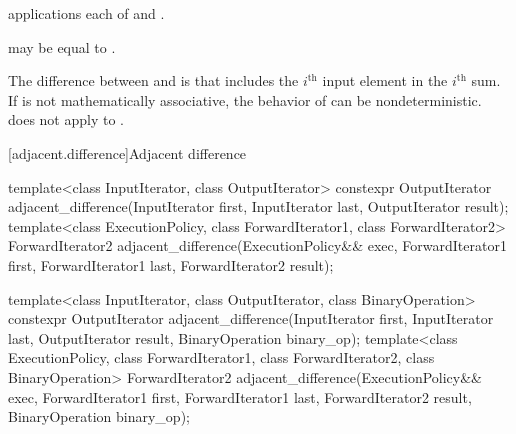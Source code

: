 \begin{itemdescr}
\pnum
\complexity
{} applications each
of  and .

\pnum
\remarks
{} may be equal to .

\pnum
\begin{note}
The difference between  and
 is that 
includes the $i^\text{th}$ input element in the $i^\text{th}$ sum.
If  is not mathematically associative,
the behavior of  can be nondeterministic.
 does not
apply  to .
\end{note}
\end{itemdescr}

[adjacent.difference]{Adjacent difference}

%
\begin{itemdecl}
template<class InputIterator, class OutputIterator>
  constexpr OutputIterator
    adjacent_difference(InputIterator first, InputIterator last,
                        OutputIterator result);
template<class ExecutionPolicy, class ForwardIterator1, class ForwardIterator2>
  ForwardIterator2
    adjacent_difference(ExecutionPolicy&& exec,
                        ForwardIterator1 first, ForwardIterator1 last, ForwardIterator2 result);

template<class InputIterator, class OutputIterator, class BinaryOperation>
  constexpr OutputIterator
    adjacent_difference(InputIterator first, InputIterator last,
                        OutputIterator result, BinaryOperation binary_op);
template<class ExecutionPolicy, class ForwardIterator1, class ForwardIterator2,
         class BinaryOperation>
  ForwardIterator2
    adjacent_difference(ExecutionPolicy&& exec,
                        ForwardIterator1 first, ForwardIterator1 last,
                        ForwardIterator2 result, BinaryOperation binary_op);
\end{itemdecl}

